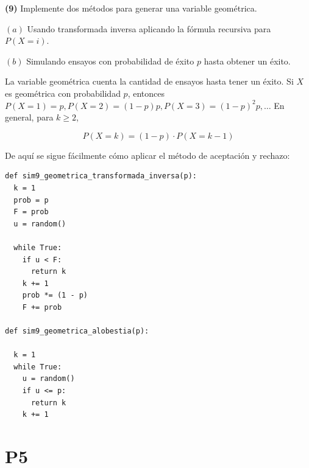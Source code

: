 \documentclass[a4paper, 12pt]{article}
\begin{document}
\pagebreak 

\begin{myframe}
  \textbf{(9)} Implemente dos métodos para generar una variable geométrica. 

  $(a)$ Usando transformada inversa aplicando la fórmula recursiva para $P(X =
  i)$.

  $(b)$ Simulando ensayos con probabilidad de éxito $p$ hasta obtener un éxito.
\end{myframe}

La variable geométrica cuenta la cantidad de ensayos hasta tener un éxito. Si 
$X$ es geométrica con probabilidad $p$, entonces $P(X = 1) = p, P(X = 2) =
(1-p)p, P(X = 3) = (1-p)^2p, \ldots$ En general, para $k \geq 2$,

\begin{equation*}
  P(X = k) = (1-p) \cdot P(X = k - 1)
\end{equation*}

De aquí se sigue fácilmente cómo aplicar el método de aceptación y rechazo:

\footnotesize 
\begin{verbatim}
def sim9_geometrica_transformada_inversa(p):
  k = 1 
  prob = p
  F = prob
  u = random()
  
  while True:
    if u < F:
      return k 
    k += 1 
    prob *= (1 - p)
    F += prob

def sim9_geometrica_alobestia(p):

  k = 1
  while True:
    u = random()
    if u <= p:
      return k 
    k += 1
\end{verbatim}
\normalsize

\pagebreak 

\section{P5}
\end{document}
